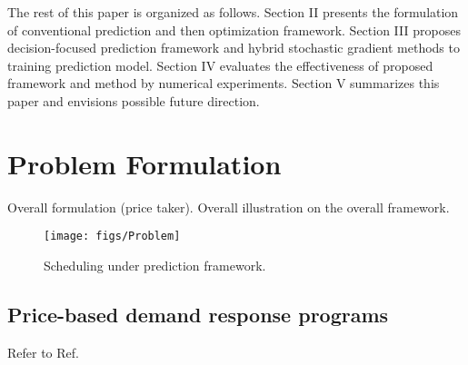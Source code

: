 \documentclass[journal]{IEEEtran}
\newcommand{\slw}{\color{blue}}
\begin{document}
The rest of this paper is organized as follows. Section II presents the formulation of conventional prediction and then optimization framework. Section III proposes decision-focused prediction framework and hybrid stochastic gradient methods to training prediction model. Section IV evaluates the effectiveness of proposed framework and method by numerical experiments. Section V summarizes this paper and envisions possible future direction.

\section{Problem Formulation}
Overall formulation (price taker). {\slw Overall illustration on the overall framework.}

\begin{figure}[ht]
  \centering
  \texttt{[image: figs/Problem]}
  \caption{Scheduling under prediction framework.}
  \label{Problemform}
\end{figure}

\subsection{Price-based demand response programs}
{\slw Refer to Ref. \cite{Chitsaz2018}}
\end{document}

